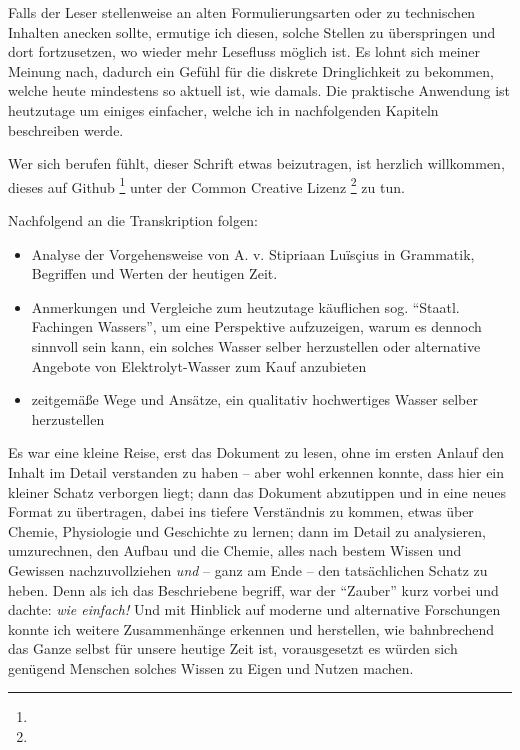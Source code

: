 \documentclass[a5paper,8pt]{scrbook}
\begin{document}
Falls der Leser
stellenweise an alten Formulierungsarten
oder zu technischen Inhalten anecken sollte,
ermutige ich diesen,
solche Stellen zu überspringen und dort fortzusetzen,
wo wieder mehr Lesefluss möglich ist.
Es lohnt sich meiner Meinung nach,
dadurch ein Gefühl für die diskrete Dringlichkeit zu bekommen,
welche heute mindestens so aktuell ist, wie damals.
Die praktische Anwendung ist heutzutage um einiges einfacher,
welche ich in nachfolgenden Kapiteln beschreiben werde.

Wer sich berufen fühlt, dieser Schrift etwas beizutragen,
ist herzlich willkommen, dieses auf Github
\footnote{}
unter der Common Creative Lizenz
\footnote{}
zu tun.\\

\setcounter{page}{3}

Nachfolgend an die Transkription folgen:
\begin{itemize}
\item Analyse der Vorgehensweise von A. v. Stipriaan Luïsçius
in Grammatik, Begriffen und Werten der heutigen Zeit.
\item Anmerkungen und Vergleiche zum heutzutage käuflichen
sog. ``Staatl. Fachingen Wassers'',
um eine Perspektive aufzuzeigen,
warum es dennoch sinnvoll sein kann,
ein solches Wasser selber herzustellen
oder alternative Angebote von Elektrolyt-Wasser zum Kauf anzubieten
\item zeitgemäße Wege und Ansätze, ein qualitativ hochwertiges Wasser selber herzustellen
\end{itemize}


Es war eine kleine Reise,
erst das Dokument zu lesen,
ohne im ersten Anlauf den Inhalt im Detail verstanden zu haben --
aber wohl erkennen konnte,
dass hier ein kleiner Schatz verborgen liegt;
dann das Dokument abzutippen
und in eine neues Format zu übertragen,
dabei ins tiefere Verständnis zu kommen,
etwas über Chemie, Physiologie und Geschichte zu lernen;
dann im Detail zu analysieren, umzurechnen,
den Aufbau und die Chemie,
alles nach bestem Wissen und Gewissen nachzuvollziehen
\emph{und} -- ganz am Ende -- den tatsächlichen Schatz zu heben.
Denn als ich das Beschriebene begriff,
war der ``Zauber'' kurz vorbei
und dachte: \emph{wie einfach!}
Und mit Hinblick auf moderne und alternative Forschungen
konnte ich weitere Zusammenhänge erkennen und herstellen,
wie bahnbrechend das Ganze selbst für unsere heutige Zeit ist,
vorausgesetzt es würden sich genügend Menschen
solches Wissen zu Eigen und Nutzen machen.
\end{document}
